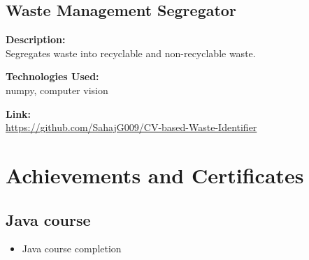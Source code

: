 \documentclass[a4paper,10pt]{article}
\begin{document}
\subsection*{Waste Management Segregator}

\noindent
\begin{minipage}[t]{0.4\textwidth}
  \textbf{Description:}\\
  Segregates waste into recyclable and non-recyclable waste.
\end{minipage}%
\begin{minipage}[t]{0.4\textwidth}
  \textbf{Technologies Used:}\\
  numpy, computer vision
\end{minipage}%
\begin{minipage}[t]{0.2\textwidth}
  \textbf{Link:}\\
  \url{https://github.com/SahajG009/CV-based-Waste-Identifier}
\end{minipage}



\section{Achievements and Certificates}

\subsection*{Java course}

\begin{multicols}{2}
    \begin{itemize}
        \item Java course completion
    \end{itemize}
\end{multicols}
\end{document}
